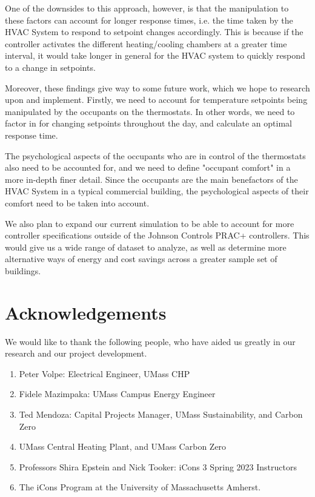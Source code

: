 \documentclass[conference,letterpaper]{IEEEtran}
\begin{document}
One of the downsides to this approach, however, is that the manipulation to these factors can account for longer response times, i.e. the time taken by the HVAC System to respond to setpoint changes accordingly. This is because if the controller activates the different heating/cooling chambers at a greater time interval, it would take longer in general for the HVAC system to quickly respond to a change in setpoints. 

Moreover, these findings give way to some future work, which we hope to research upon and implement. Firstly, we need to account for temperature setpoints being manipulated by the occupants on the thermostats. In other words, we need to factor in for changing setpoints throughout the day, and calculate an optimal response time.

The psychological aspects of the occupants who are in control of the thermostats also need to be accounted for, and we need to define "occupant comfort" in a more in-depth finer detail. Since the occupants are the main benefactors of the HVAC System in a typical commercial building, the psychological aspects of their comfort need to be taken into account.

We also plan to expand our current simulation to be able to account for more controller specifications outside of the Johnson Controls PRAC+ controllers. This would give us a wide range of dataset to analyze, as well as determine more alternative ways of energy and cost savings across a greater sample set of buildings.

\section{Acknowledgements}
We would like to thank the following people, who have aided us greatly in our research and our project development.
\begin{enumerate}
    \item Peter Volpe: Electrical Engineer, UMass CHP
    \item Fidele Mazimpaka: UMass Campus Energy Engineer
    \item Ted Mendoza: Capital Projects Manager, UMass Sustainability, and Carbon Zero
    \item UMass Central Heating Plant, and UMass Carbon Zero
    \item Professors Shira Epstein and Nick Tooker: iCons 3 Spring 2023 Instructors
    \item The iCons Program at the University of Massachusetts Amherst.
\end{enumerate}





\end{document}
